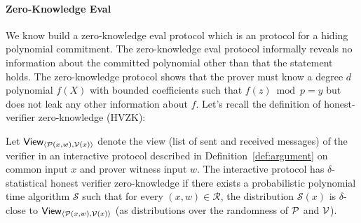 \paragraph{Zero-Knowledge Eval}
We know build a zero-knowledge eval protocol which is an \eval protocol for a hiding polynomial commitment. The zero-knowledge eval protocol informally reveals no information about the committed polynomial other than that the \eval statement holds. The zero-knowledge protocol shows that the prover must know a degree $d$ polynomial $f(X)$ with bounded coefficients such that $f(z)\bmod p = y$ but does not leak any other information about $f$. Let's recall the definition of honest-verifier zero-knowledge (HVZK):

\begin{definition}
Let $\textsf{View}_{\langle \mathcal{P}(x, w), \mathcal{V}(x) \rangle}$ denote the view (list of sent and received messages) of the verifier in an interactive protocol described in Definition~\ref{def:argument} on common input $x$ and prover witness input $w$. The interactive protocol has $\delta$-statistical honest verifier zero-knowledge if there exists a probabilistic polynomial time algorithm $\mathcal{S}$ such that for every $(x, w) \in \mathcal{R}$, the distribution $\mathcal{S}(x)$ is $\delta$-close to $\textsf{View}_{\langle \mathcal{P}(x, w), \mathcal{V}(x) \rangle}$ (as distributions over the randomness of $\mathcal{P}$ and $\mathcal{V}$).
\end{definition}


